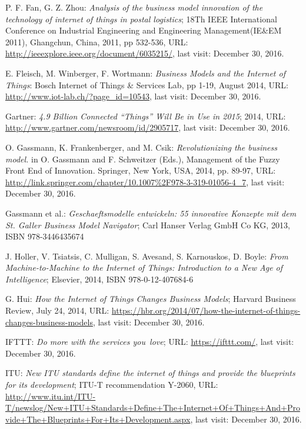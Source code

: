 \begin{thebibliography}{99}
	 P. F. Fan, G. Z. Zhou: \emph{Analysis of the business model innovation of the technology of internet of things in postal logistics}; 18Th IEEE International Conference on Industrial Engineering and Engineering Management(IE\&EM 2011), Ghangchun, China, 2011, pp 532-536, URL: \url{http://ieeexplore.ieee.org/document/6035215/}, last visit: December 30, 2016.

	 E. Fleisch, M. Winberger, F. Wortmann: \emph{Business Models and the Internet of Things}: Bosch Internet of Things \& Services Lab, pp 1-19, August 2014, URL: \url{http://www.iot-lab.ch/?page_id=10543}, last visit: December 30, 2016.

 	 Gartner: \emph{4.9 Billion Connected ``Things'' Will Be in Use in 2015}; 2014, URL: \url{http://www.gartner.com/newsroom/id/2905717}, last visit: December 30, 2016.
	
	 O. Gassmann, K. Frankenberger, and M. Csik: \emph{Revolutionizing the business model.} in O. Gassmann and F. Schweitzer (Eds.), Management of the Fuzzy Front End of Innovation. Springer, New York, USA, 2014, pp. 89-97, URL: \url{http://link.springer.com/chapter/10.1007%2F978-3-319-01056-4_7}, last visit: December 30, 2016.

	 Gassmann et al.: \emph{Geschaeftsmodelle entwickeln: 55 innovative Konzepte mit dem St. Galler Business Model Navigator}; Carl Hanser Verlag GmbH Co KG, 2013, ISBN 978-3446435674
	
	 J. Holler, V. Tsiatsis, C. Mulligan, S. Avesand, S. Karnouskos, D. Boyle: \emph{From Machine-to-Machine to the Internet of Things: Introduction to a New Age of Intelligence}; Elsevier, 2014, ISBN 978-0-12-407684-6
	
	 G. Hui: \emph{How the Internet of Things Changes Business Models}; Harvard Business Review, July 24, 2014, URL: \url{https://hbr.org/2014/07/how-the-internet-of-things-changes-business-models}, last visit: December 30, 2016.

	 IFTTT: \emph{Do more with the services you love}; URL: \url{https://ifttt.com/}, last visit: December 30, 2016.

 	 ITU: \emph{New ITU standards define the internet of things and provide the blueprints for its development}; ITU-T recommendation   Y-2060, URL: \url{http://www.itu.int/ITU-T/newslog/New+ITU+Standards+Define+The+Internet+Of+Things+And+Provide+The+Blueprints+For+Its+Development.aspx}, last visit: December 30, 2016.


\end{thebibliography}
